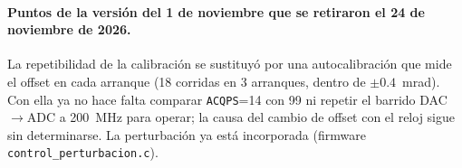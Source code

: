 \documentclass[11pt,a4paper]{article}
\begin{document}
\paragraph{Puntos de la versi\'on del 1 de noviembre que se retiraron el 24 de noviembre de 2026.}
La repetibilidad de la calibraci\'on se sustituy\'o por una autocalibraci\'on que mide el offset en cada arranque (18 corridas en 3 arranques, dentro de $\pm0.4$~mrad). Con ella ya no hace falta comparar \texttt{ACQPS}=14 con 99 ni repetir el barrido DAC$\rightarrow$ADC a 200~MHz para operar; la causa del cambio de offset con el reloj sigue sin determinarse. La perturbaci\'on ya est\'a incorporada (firmware \texttt{control\_perturbacion.c}).
\end{document}
